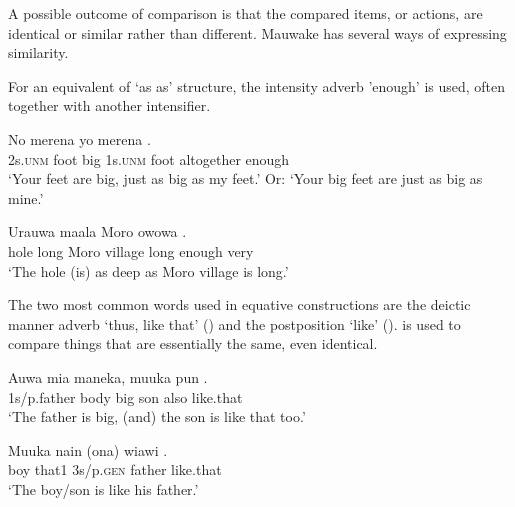 A possible outcome of comparison is that the compared items, or actions, are identical or similar rather than different. Mauwake has several ways of expressing similarity. 

For an equivalent of  `as  as' structure, the intensity adverb  'enough' is used, often together with another intensifier.

\ea%
\label{ex:6:x1331}
\gll No  merena    yo  merena    . \\
2s.\textsc{unm}  foot  big  1s.\textsc{unm}  foot  altogether  enough\\
\glt `Your feet are big, just as big as my feet.' Or: `Your big feet are just as big as mine.'
\z

\ea%
\label{ex:6:x1332}
\gll Urauwa  maala  Moro  owowa      . \\
hole  long  Moro  village  long  enough  very\\
\glt `The hole (is) as deep as Moro village is long.'
\z

The two most common words used in equative constructions are the deictic manner adverb  `thus, like that' () and the postposition  `like' ().  is used to compare things that are essentially the same, even identical.

\ea%
\label{ex:6:x1338}
\gll Auwa  mia  maneka,  muuka  pun  . \\
1s/p.father  body  big  son  also  like.that\\
\glt `The father is big, (and) the son is like that too.'
\z

\ea%
\label{ex:6:x1339}
\gll Muuka  nain  (ona)  wiawi  . \\
boy  that1  3s/p.\textsc{gen}  father  like.that\\
\glt `The boy/son is like his father.'
\z


